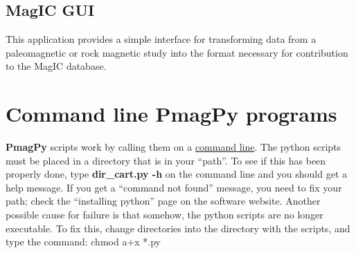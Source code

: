 \documentclass[11pt]{book}
\begin{document}
{%

\subsection{MagIC GUI}

This application provides a simple interface for transforming data from a paleomagnetic or rock magnetic study into the format necessary for contribution to the MagIC database.

\section{Command line PmagPy programs}

{\bf PmagPy}  scripts work by calling them on a \href{#command_line}{command line}.
 The python scripts must be placed in a directory that is in your ``path''.  To see if this has been properly done, type {\bf dir\_cart.py -h} on the command line and you should get a help message.  If you get a ``command not found'' message, you need to fix your path; check the ``installing python'' page on the software website.   Another possible cause for failure is that somehow, the python scripts are no longer executable.  To fix this, change directories into the directory with the scripts, and type the command:  chmod a+x *.py

}
\end{document}
